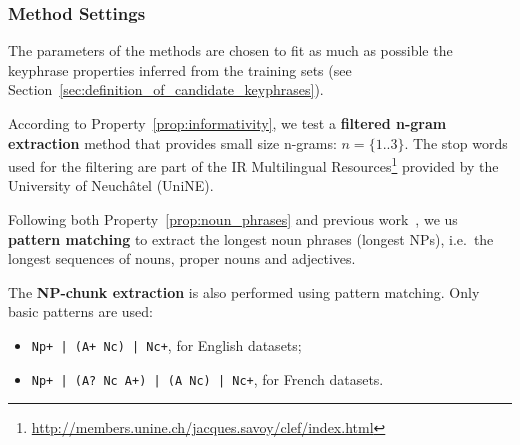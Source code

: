     \subsubsection{Method Settings}
    \label{subsubsec:method_settings}
      The parameters of the methods are chosen to fit as much as possible the
      keyphrase properties inferred from the training sets (see
      Section~\ref{sec:definition_of_candidate_keyphrases}).

      According to Property~\ref{prop:informativity}, we test a \textbf{filtered
      n-gram extraction} method that provides small size n-grams:
      $n = \{1..3\}$. The stop words used for the filtering are part of the IR
      Multilingual
      Resources\footnote{\url{http://members.unine.ch/jacques.savoy/clef/index.html}}
      provided by the University of Neuchâtel (UniNE).

      Following both Property~\ref{prop:noun_phrases} and previous
      work~\cite{hassan2010conundrums}, we us \textbf{pattern matching} to
      extract the longest noun phrases (longest NPs), i.e.~the longest sequences
      of nouns, proper nouns and adjectives.

      The \textbf{NP-chunk extraction} is also performed using pattern matching.
      Only basic patterns are used:
      \begin{itemize}
        \item{\verb:Np+ | (A+ Nc) | Nc+:, for English datasets;}
        \item{\verb:Np+ | (A? Nc A+) | (A Nc) | Nc+:, for French datasets.}
      \end{itemize}



